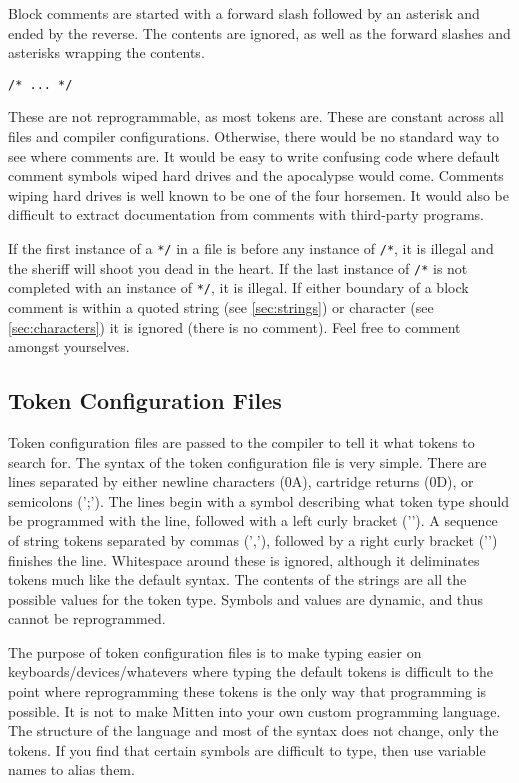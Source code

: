 \documentclass[10pt,a4paper]{article}
\begin{document}
Block comments are started with a forward slash followed by an asterisk and ended by the reverse. The contents are ignored, as well as the forward slashes and asterisks wrapping the contents.
\begin{verbatim}
/* ... */
\end{verbatim}

These are not reprogrammable, as most tokens are. These are constant across all files and compiler configurations. Otherwise, there would be no standard way to see where comments are. It would be easy to write confusing code where default comment symbols wiped hard drives and the apocalypse would come. Comments wiping hard drives is well known to be one of the four horsemen. It would also be difficult to extract documentation from comments with third-party programs. 

If the first instance of a \verb|*/| in a file is before any instance of \verb|/*|, it is illegal and the sheriff will shoot you dead in the heart. If the last instance of \verb|/*| is not completed with an instance of \verb|*/|, it is illegal. If either boundary of a block comment is within a quoted string (see \ref{sec:strings}) or character (see \ref{sec:characters}) it is ignored (there is no comment). Feel free to comment amongst yourselves. 

\subsection{Token Configuration Files}
Token configuration files are passed to the compiler to tell it what tokens to search for. The syntax of the token configuration file is very simple. There are lines separated by either newline characters (0A), cartridge returns (0D), or semicolons (';'). The lines begin with a symbol describing what token type should be programmed with the line, followed with a left curly bracket ('{'). A sequence of string tokens separated by commas (','), followed by a right curly bracket ('}') finishes the line. Whitespace around these is ignored, although it deliminates tokens much like the default syntax. The contents of the strings are all the possible values for the token type. Symbols and values are dynamic, and thus cannot be reprogrammed.

The purpose of token configuration files is to make typing easier on keyboards/devices/whatevers where typing the default tokens is difficult to the point where reprogramming these tokens is the only way that programming is possible. It is not to make Mitten into your own custom programming language. The structure of the language and most of the syntax does not change, only the tokens. If you find that certain symbols are difficult to type, then use variable names to alias them.
\end{document}
